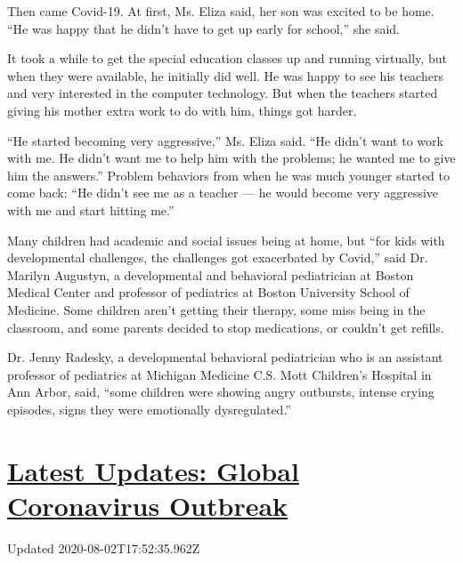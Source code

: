 Then came Covid-19. At first, Ms. Eliza said, her son was excited to be
home. ``He was happy that he didn't have to get up early for school,''
she said.

It took a while to get the special education classes up and running
virtually, but when they were available, he initially did well. He was
happy to see his teachers and very interested in the computer
technology. But when the teachers started giving his mother extra work
to do with him, things got harder.

``He started becoming very aggressive,'' Ms. Eliza said. ``He didn't
want to work with me. He didn't want me to help him with the problems;
he wanted me to give him the answers.'' Problem behaviors from when he
was much younger started to come back: ``He didn't see me as a teacher
--- he would become very aggressive with me and start hitting me.''

Many children had academic and social issues being at home, but ``for
kids with developmental challenges, the challenges got exacerbated by
Covid,'' said Dr. Marilyn Augustyn, a developmental and behavioral
pediatrician at Boston Medical Center and professor of pediatrics at
Boston University School of Medicine. Some children aren't getting their
therapy, some miss being in the classroom, and some parents decided to
stop medications, or couldn't get refills.

Dr. Jenny Radesky, a developmental behavioral pediatrician who is an
assistant professor of pediatrics at Michigan Medicine C.S. Mott
Children's Hospital in Ann Arbor, said, ``some children were showing
angry outbursts, intense crying episodes, signs they were emotionally
dysregulated.''

\hypertarget{latest-updates-global-coronavirus-outbreak}{%
\section{\texorpdfstring{\href{https://www.nytimes3xbfgragh.onion/2020/08/01/world/coronavirus-covid-19.html?action=click\&pgtype=Article\&state=default\&region=MAIN_CONTENT_1\&context=storylines_live_updates}{Latest
Updates: Global Coronavirus
Outbreak}}{Latest Updates: Global Coronavirus Outbreak}}\label{latest-updates-global-coronavirus-outbreak}}

Updated 2020-08-02T17:52:35.962Z

